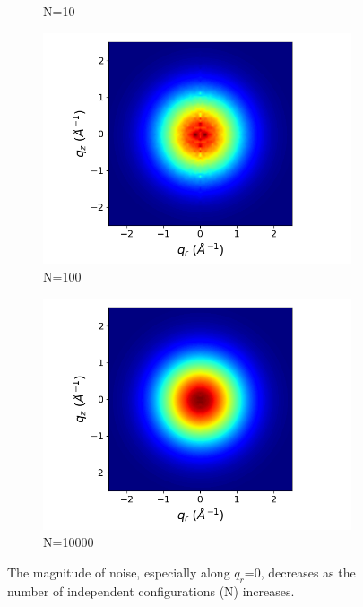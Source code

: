 \documentclass[journal=jpcbfk,manusciprt=article]{achemso}
\begin{document}
\begin{figure}[!htb]
\begin{subfigure}{0.45\linewidth}
  \caption{N=10}
  \end{subfigure}
  \begin{subfigure}{0.45\linewidth}
  \centering
  \includegraphics[width=\textwidth]{xrd_100frame.png}
  \caption{N=100}
  \end{subfigure}
  \begin{subfigure}{0.45\linewidth}
  \centering
  \includegraphics[width=\textwidth]{xrd_10000frame.png}
  \caption{N=10000}
  \end{subfigure}
  \caption{The magnitude of noise, especially along $q_r$=0, decreases
  as the number of independent configurations (N) increases.}\label{fig:xrd_noise}
  \end{figure}
 
\end{document}
